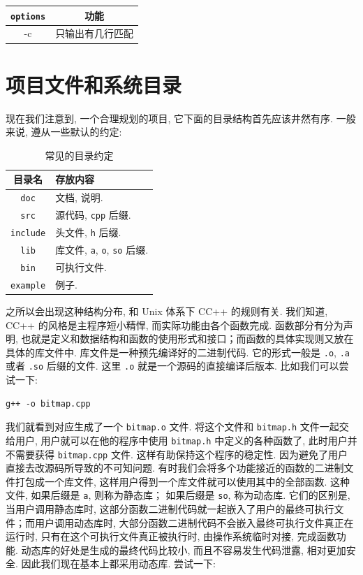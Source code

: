 \documentclass[a4paper]{ctexart}
\begin{document}
\begin{table}
  \centering
  \begin{tabular}{|c|c|}
    \hline
    \verb|options| & 功能 \\
    \hline
    -c & 只输出有几行匹配\\
    \hline
    
  \end{tabular}
\end{table}

\section{项目文件和系统目录}
现在我们注意到, 一个合理规划的项目, 它下面的目录结构首先应该井然有序. 一般来说, 遵从一些默认的约定:

\begin{table}[!phb]
  \centering
  \begin{tabular}{|c|l|}
    \hline
    \bf{目录名} & \bf{存放内容} \\
    \hline
    \verb|doc| & 文档, 说明. \\
    \hline
    \verb|src| & 源代码, \verb|cpp| 后缀. \\
    \hline
    \verb|include| & 头文件, \verb|h| 后缀. \\
    \hline
    \verb|lib| & 库文件, \verb|a|, \verb|o|, \verb|so| 后缀. \\
    \hline
    \verb|bin| & 可执行文件. \\
    \hline
    \verb|example| & 例子. \\
    \hline
  \end{tabular}
  \caption{常见的目录约定}
  \label{tab::dir}
\end{table}

之所以会出现这种结构分布, 和 Unix 体系下 C\/C++ 的规则有关. 我们知道,
C\/C++ 的风格是主程序短小精悍, 而实际功能由各个函数完成. 函数部分有分为声明,
也就是定义和数据结构和函数的使用形式和接口；而函数的具体实现则又放在具体的库文件中.
库文件是一种预先编译好的二进制代码. 它的形式一般是 \verb|.o|, \verb|.a| 或者
\verb|.so| 后缀的文件. 这里 \verb|.o| 就是一个源码的直接编译后版本. 比如我们可以尝试一下:
\begin{verbatim}
g++ -o bitmap.cpp
\end{verbatim}
我们就看到对应生成了一个 \verb|bitmap.o| 文件. 将这个文件和 \verb|bitmap.h| 文件一起交给用户,
用户就可以在他的程序中使用 \verb|bitmap.h| 中定义的各种函数了, 此时用户并不需要获得
\verb|bitmap.cpp| 文件. 这样有助保持这个程序的稳定性.
因为避免了用户直接去改源码所导致的不可知问题. 有时我们会将多个功能接近的函数的二进制文件打包成一个库文件,
这样用户得到一个库文件就可以使用其中的全部函数. 这种文件, 如果后缀是 \verb|a|, 则称为静态库；
如果后缀是 \verb|so|, 称为动态库. 它们的区别是, 当用户调用静态库时,
这部分函数二进制代码就一起嵌入了用户的最终可执行文件；而用户调用动态库时,
大部分函数二进制代码不会嵌入最终可执行文件真正在运行时, 只有在这个可执行文件真正被执行时, 由操作系统临时对接,
完成函数功能. 动态库的好处是生成的最终代码比较小, 而且不容易发生代码泄露, 相对更加安全.
因此我们现在基本上都采用动态库. 尝试一下:
\end{document}
